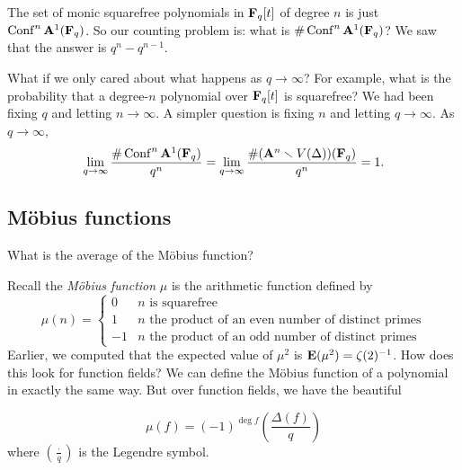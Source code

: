 The set of monic squarefree polynomials in $\mathbf{F}_q[t]$ of degree $n$ is just 
$\operatorname{Conf}^n\mathbf{A}^1(\mathbf{F}_q)$. So our counting problem is: what is 
$\#\operatorname{Conf}^n\mathbf{A}^1(\mathbf{F}_q)$? We saw that the answer is $q^n-q^{n-1}$. 

What if we only cared about what happens as $q\to \infty$? For example, what is 
the probability that a degree-$n$ polynomial over $\mathbf{F}_q[t]$ is squarefree? We 
had been fixing $q$ and letting $n\to \infty$. A simpler question is fixing $n$ 
and letting $q\to \infty$. As $q\to \infty$, 
\[
  \lim_{q\to\infty}\frac{\#\operatorname{Conf}^n\mathbf{A}^1(\mathbf{F}_q)}{q^n} 
    = \lim_{q\to \infty}\frac{\#(\mathbf{A}^n\smallsetminus V(\Delta))(\mathbf{F}_q)}{q^n} 
    = 1 .
\]





\subsection{M\"obius functions}

\begin{question}
What is the average of the M\"obius function?
\end{question}

Recall the \emph{M\"obius function} $\mu$ is the arithmetic function defined by 
\[
  \mu(n) = \begin{cases} 0 & n\text{ is squarefree} \\ 1 & n\text{ the product of an even number of distinct primes} \\ -1 & n\text{ the product of an odd number of distinct primes} \end{cases}
\]
Earlier, we computed that the expected value of $\mu^2$ is 
$\operatorname{\mathbf{E}}(\mu^2)=\zeta(2)^{-1}$. How does this look for function fields? We 
can define the M\"obius function of a polynomial in exactly the same way. But 
over function fields, we have the beautiful 

\begin{fact}
\[
  \mu(f) = (-1)^{\deg f} \left(\frac{\Delta(f)}{q}\right) 
\]
where $\left(\frac{\cdot}{q}\right)$ is the Legendre symbol. 
\end{fact}

